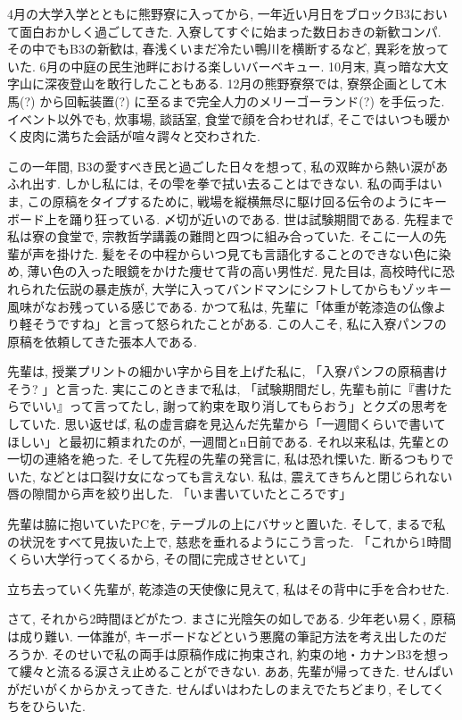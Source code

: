\documentclass[10pt,b5jsbook,dvips,dvipdfmx,openany]{jsbook}
\theoremstyle{definition}
\begin{document}
	4月の大学入学とともに熊野寮に入ってから, 一年近い月日をブロックB3において面白おかしく過ごしてきた. 入寮してすぐに始まった数日おきの新歓コンパ. その中でもB3の新歓は, 春浅くいまだ冷たい鴨川を横断するなど, 異彩を放っていた. 6月の中庭の民生池畔における楽しいバーベキュー. 10月末, 真っ暗な大文字山に深夜登山を敢行したこともある. 12月の熊野寮祭では, 寮祭企画として木馬(?) から回転装置(?) に至るまで完全人力のメリーゴーランド(?) を手伝った. イベント以外でも, 炊事場, 談話室, 食堂で顔を合わせれば, そこではいつも暖かく皮肉に満ちた会話が喧々諤々と交わされた.

	この一年間, B3の愛すべき民と過ごした日々を想って, 私の双眸から熱い涙があふれ出す. しかし私には, その雫を拳で拭い去ることはできない. 私の両手はいま, この原稿をタイプするために, 戦場を縦横無尽に駆け回る伝令のようにキーボード上を踊り狂っている. 〆切が近いのである. 世は試験期間である. 先程まで私は寮の食堂で, 宗教哲学講義の難問と四つに組み合っていた. そこに一人の先輩が声を掛けた. 髪をその中程からいつ見ても言語化することのできない色に染め, 薄い色の入った眼鏡をかけた痩せて背の高い男性だ. 見た目は, 高校時代に恐れられた伝説の暴走族が, 大学に入ってバンドマンにシフトしてからもゾッキー風味がなお残っている感じである. かつて私は, 先輩に「体重が乾漆造の仏像より軽そうですね」と言って怒られたことがある. この人こそ, 私に入寮パンフの原稿を依頼してきた張本人である.

	先輩は, 授業プリントの細かい字から目を上げた私に, 「入寮パンフの原稿書けそう? 」と言った. 実にこのときまで私は, 「試験期間だし, 先輩も前に『書けたらでいい』って言ってたし, 謝って約束を取り消してもらおう」とクズの思考をしていた. 思い返せば, 私の虚言癖を見込んだ先輩から「一週間くらいで書いてほしい」と最初に頼まれたのが, 一週間とn日前である. それ以来私は, 先輩との一切の連絡を絶った. そして先程の先輩の発言に, 私は恐れ慄いた. 断るつもりでいた, などとは口裂け女になっても言えない. 私は, 震えてきちんと閉じられない唇の隙間から声を絞り出した. 「いま書いていたところです」

	先輩は脇に抱いていたPCを, テーブルの上にバサッと置いた. そして, まるで私の状況をすべて見抜いた上で, 慈悲を垂れるようにこう言った. 「これから1時間くらい大学行ってくるから, その間に完成させといて」

	立ち去っていく先輩が, 乾漆造の天使像に見えて, 私はその背中に手を合わせた.

	さて, それから2時間ほどがたつ. まさに光陰矢の如しである. 少年老い易く, 原稿は成り難い. 一体誰が, キーボードなどという悪魔の筆記方法を考え出したのだろうか. そのせいで私の両手は原稿作成に拘束され, 約束の地・カナンB3を想って縷々と流るる涙さえ止めることができない. ああ, 先輩が帰ってきた. せんぱいがだいがくからかえってきた. せんぱいはわたしのまえでたちどまり, そしてくちをひらいた.
\end{document}
